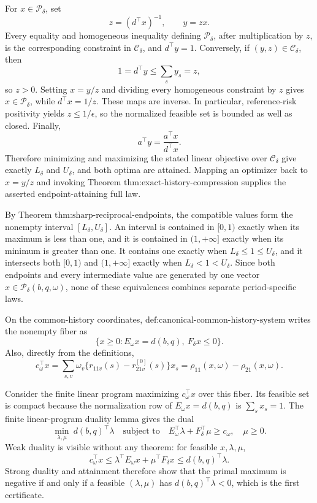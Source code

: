For \(x\in\mathcal P_\delta\), set
\[
z=(d^\top x)^{-1},\qquad y=zx.
\]
Every equality and homogeneous inequality defining \(\mathcal P_\delta\), after multiplication by \(z\), is the corresponding constraint in \(\mathcal C_\delta\), and \(d^\top y=1\).  Conversely, if \((y,z)\in\mathcal C_\delta\), then
\[
1=d^\top y\leq\sum_sy_s=z,
\]
so \(z>0\).  Setting \(x=y/z\) and dividing every homogeneous constraint by \(z\) gives \(x\in\mathcal P_\delta\), while \(d^\top x=1/z\).  These maps are inverse.  In particular, reference-risk positivity yields \(z\leq1/\epsilon\), so the normalized feasible set is bounded as well as closed.  Finally,
\[
a^\top y=\frac{a^\top x}{d^\top x}.
\]
Therefore minimizing and maximizing the stated linear objective over \(\mathcal C_\delta\) give exactly \(L_\delta\) and \(U_\delta\), and both optima are attained.  Mapping an optimizer back to \(x=y/z\) and invoking Theorem \(\text{thm:exact-history-compression}\) supplies the asserted endpoint-attaining full law.

By Theorem \(\text{thm:sharp-reciprocal-endpoints}\), the compatible values form the nonempty interval \([L_\delta,U_\delta]\).  An interval is contained in \([0,1)\) exactly when its maximum is less than one, and it is contained in \((1,+\infty]\) exactly when its minimum is greater than one.  It contains one exactly when \(L_\delta\leq1\leq U_\delta\), and it intersects both \([0,1)\) and \((1,+\infty]\) exactly when \(L_\delta<1<U_\delta\).  Since both endpoints and every intermediate value are generated by one vector \(x\in\mathcal P_\delta(b,q,\omega)\), none of these equivalences combines separate period-specific laws.

On the common-history coordinates, \(\text{def:canonical-common-history-system}\) writes the nonempty fiber as
\[
\{x\geq0:E_\omega x=d(b,q),\ F_\delta x\leq0\}.
\]
Also, directly from the definitions,
\[
c_\omega^\top x
=\sum_{s,v}\omega_v\{r_{11v}(s)-r^{[0]}_{21v}(s)\}x_s
=\rho_{11}(x,\omega)-\rho_{21}(x,\omega).
\]

Consider the finite linear program maximizing \(c_\omega^\top x\) over this fiber.  Its feasible set is compact because the normalization row of \(E_\omega x=d(b,q)\) is \(\sum_sx_s=1\).  The finite linear-program duality lemma gives the dual
\[
\min_{\lambda,\mu}\ d(b,q)^\top\lambda
\quad\text{subject to}\quad
E_\omega^\top\lambda+F_\delta^\top\mu\geq c_\omega,
\quad \mu\geq0.
\]
Weak duality is visible without any theorem: for feasible \(x,\lambda,\mu\),
\[
c_\omega^\top x
\leq\lambda^\top E_\omega x+\mu^\top F_\delta x
\leq d(b,q)^\top\lambda.
\]
Strong duality and attainment therefore show that the primal maximum is negative if and only if a feasible \((\lambda,\mu)\) has \(d(b,q)^\top\lambda<0\), which is the first certificate.

